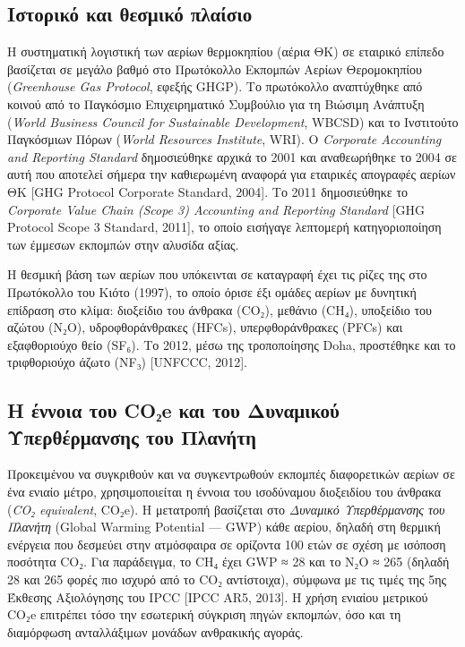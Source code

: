\documentclass[11pt,a4paper,greek,twoside]{template-xe}
\begin{document}
\subsection{Ιστορικό και θεσμικό
πλαίσιο}\label{ux3b9ux3c3ux3c4ux3bfux3c1ux3b9ux3baux3cc-ux3baux3b1ux3b9-ux3b8ux3b5ux3c3ux3bcux3b9ux3baux3cc-ux3c0ux3bbux3b1ux3afux3c3ux3b9ux3bf}

Η συστηματική λογιστική των αερίων θερμοκηπίου (αέρια ΘΚ) σε εταιρικό
επίπεδο βασίζεται σε μεγάλο βαθμό στο Πρωτόκολλο Εκπομπών Αερίων
Θερομοκηπίου (\emph{Greenhouse Gas Protocol}, εφεξής GHGP). Το
πρωτόκολλο αναπτύχθηκε από κοινού από το Παγκόσμιο Επιχειρηματικό
Συμβούλιο για τη Βιώσιμη Ανάπτυξη (\emph{World Business Council for
Sustainable Development}, WBCSD) και το Ινστιτούτο Παγκόσμιων Πόρων
(\emph{World Resources Institute}, WRI). Ο \emph{Corporate Accounting
and Reporting Standard} δημοσιεύθηκε αρχικά το 2001 και αναθεωρήθηκε το
2004 σε αυτή που αποτελεί σήμερα την καθιερωμένη αναφορά για εταιρικές
απογραφές αερίων ΘΚ {[}GHG Protocol Corporate Standard, 2004{]}. Το 2011
δημοσιεύθηκε το \emph{Corporate Value Chain (Scope 3) Accounting and
Reporting Standard} {[}GHG Protocol Scope 3 Standard, 2011{]}, το οποίο
εισήγαγε λεπτομερή κατηγοριοποίηση των έμμεσων εκπομπών στην αλυσίδα
αξίας.

Η θεσμική βάση των αερίων που υπόκεινται σε καταγραφή έχει τις ρίζες της
στο Πρωτόκολλο του Κιότο (1997), το οποίο όρισε έξι ομάδες αερίων με
δυνητική επίδραση στο κλίμα: διοξείδιο του άνθρακα (CO₂), μεθάνιο (CH₄),
υποξείδιο του αζώτου (N₂O), υδροφθοράνθρακες (HFCs), υπερφθοράνθρακες
(PFCs) και εξαφθοριούχο θείο (SF₆). Το 2012, μέσω της τροποποίησης Doha,
προστέθηκε και το τριφθοριούχο άζωτο (NF₃) {[}UNFCCC, 2012{]}.

\subsection{Η έννοια του CO₂e και του Δυναμικού Υπερθέρμανσης του
Πλανήτη}\label{ux3b7-ux3adux3bdux3bdux3bfux3b9ux3b1-ux3c4ux3bfux3c5-coux2082e-ux3baux3b1ux3b9-ux3c4ux3bfux3c5-ux3b4ux3c5ux3bdux3b1ux3bcux3b9ux3baux3bfux3cd-ux3c5ux3c0ux3b5ux3c1ux3b8ux3adux3c1ux3bcux3b1ux3bdux3c3ux3b7ux3c2-ux3c4ux3bfux3c5-ux3c0ux3bbux3b1ux3bdux3aeux3c4ux3b7}

Προκειμένου να συγκριθούν και να συγκεντρωθούν εκπομπές διαφορετικών
αερίων σε ένα ενιαίο μέτρο, χρησιμοποιείται η έννοια του ισοδύναμου
διοξειδίου του άνθρακα (\emph{CO₂ equivalent}, CO₂e). Η μετατροπή
βασίζεται στο \emph{Δυναμικό Υπερθέρμανσης του Πλανήτη} (Global Warming
Potential --- GWP) κάθε αερίου, δηλαδή στη θερμική ενέργεια που δεσμεύει
στην ατμόσφαιρα σε ορίζοντα 100 ετών σε σχέση με ισόποση ποσότητα CO₂.
Για παράδειγμα, το CH₄ έχει GWP ≈ 28 και το N₂O ≈ 265 (δηλαδή 28 και 265
φορές πιο ισχυρό από το CO₂ αντίστοιχα), σύμφωνα με τις τιμές της 5ης
Έκθεσης Αξιολόγησης του IPCC {[}IPCC AR5, 2013{]}. Η χρήση ενιαίου
μετρικού CO₂e επιτρέπει τόσο την εσωτερική σύγκριση πηγών εκπομπών, όσο
και τη διαμόρφωση ανταλλάξιμων μονάδων ανθρακικής αγοράς.
\end{document}
